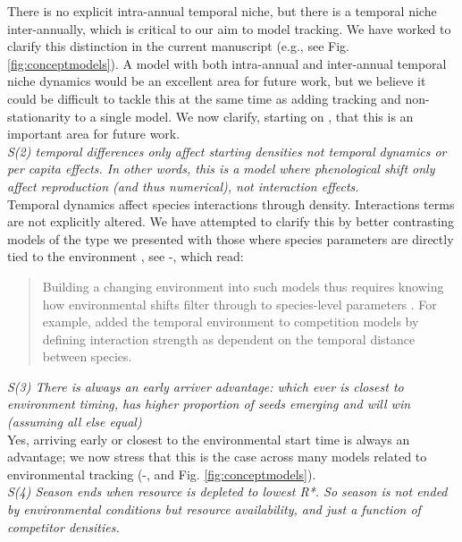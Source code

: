 \documentclass[11pt]{article}
\begin{document}
There is no explicit intra-annual temporal niche, but there is a temporal niche inter-annually, which is critical to our aim to model tracking. We have worked to clarify this distinction in the current manuscript (e.g., see Fig. \ref{fig:conceptmodels}). A model with both intra-annual and inter-annual temporal niche dynamics would be an excellent area for future work, but we believe it could be difficult to tackle this at the same time as adding tracking and non-stationarity to a single model. We now clarify, starting on , that this is an important area for future work. \\

\emph{S(2)     temporal differences only affect starting densities not temporal dynamics or per
capita effects. In other words, this is a model where phenological shift only affect
reproduction (and thus numerical), not interaction effects.}\\

Temporal dynamics affect species interactions through density. Interactions terms are not explicitly altered. We have attempted to clarify this by better contrasting models of the type we presented with those where species parameters are directly tied to the environment \citet{volkerass}, see -, which read:
\begin{quote}
Building a changing environment into such models thus requires knowing how environmental shifts filter through to species-level parameters \citep{Tuljapurkar2009}. For example, \citet{volkerass} added the temporal environment to competition models by defining interaction strength as dependent on the temporal distance between species.
\end{quote}

\emph{S(3)     There is always an early arriver advantage: which ever is closest to environment
timing, has higher proportion of seeds emerging and will win (assuming all else equal)}\\

Yes, arriving early or closest to the environmental start time is always an advantage; we now stress that this is the case across many models related to environmental tracking (-, and Fig. \ref{fig:conceptmodels}).\\

\emph{S(4)     Season ends when resource is depleted to lowest R*. So season is not ended by
environmental conditions but resource availability, and just a function of competitor
densities.}\\
\end{document}
